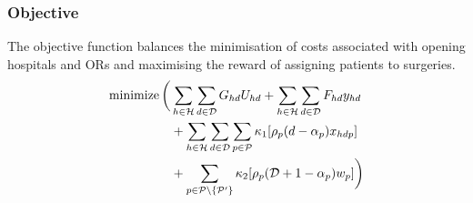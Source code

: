 \begin{table}[H]
\caption*{\bf{VARIABLES}}
\label{tab:MPvariables}
\label{MP:variables}
\end{table}
\subsubsection*{Objective}
The objective function balances the minimisation of costs associated with opening hospitals
 and ORs and maximising the reward of assigning patients to surgeries. 
\begin{align}
\operatorname{minimize} \bigg( &\sum\limits_{h \in \mathcal{H}} \sum\limits_{d \in \mathcal{D}} G_{hd} U_{hd} 
 + \sum\limits_{h \in \mathcal{H}}\sum\limits_{d \in \mathcal{D}} F_{hd} y_{hd} \label{eq:MPobjective}
\\ &+ \sum\limits_{h \in \mathcal{H}} \sum\limits_{d \in \mathcal{D}} \sum\limits_{p \in \mathcal{P}}  
\kappa_{1} [\rho_{p} (d - \alpha_{p}) x_{hdp}]\notag
\\ &+ \sum\limits_{p \in \mathcal{P} \setminus \lbrace \mathcal{P}{'} \rbrace } \kappa_{2} [\rho_{p}( \mathcal{D} + 1 -\alpha_{p} ) w_{p}]
\bigg) \notag
\end{align}
\vfill
